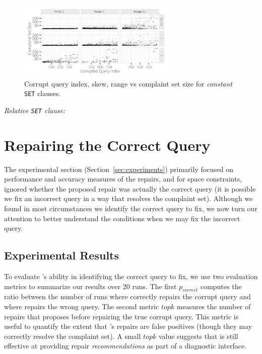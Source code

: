 \begin{figure}[h]
\centering
\includegraphics[width = 3in]{figures/qidxsimulation/qidx_v_ncomplaints_20attrs_const}
\caption{Corrupt query index, skew, range vs complaint set size for \textit{constant} \texttt{SET} clauses.}
\label{f:qidx_v_ncomplaints_const} 
\end{figure}


\smallskip
\emph{Relative \texttt{SET} clause: } 


\section{Repairing the Correct Query}
\label{app:index}

The experimental section (Section~\ref{sec:experiments}) primarily focused on performance and accuracy measures of the repairs, and for space constraints, ignored 
whether the proposed repair was actually the correct query (it is possible we fix an incorrect query in a way that resolves the complaint set).
Although we found in most circumstances we identify the correct query to fix, we now turn our attention to better understand 
the conditions when we may fix the incorrect query. 


\subsection{Experimental Results}
To evaluate \sys's ability in identifying the correct query to fix,  we use two evaluation metrics to summarize our results over 20 runs.
The first $p_{correct}$ computes the ratio between the number of runs where \sys correctly repairs the corrupt query and where \sys
repairs the wrong query.  The second metric $topk$ measures the number of repairs that \sys proposes before repairing the true corrupt query.
This metric is useful to quantify the extent that \sys's repairs are false positives (though they may correctly resolve the complaint set).
A small $topk$ value suggests that \sys is still effective at providing repair \emph{recommendations} as part of a diagnostic interface.

